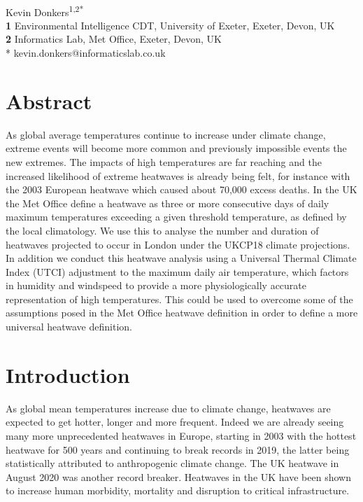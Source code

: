 \documentclass[10pt,letterpaper]{article}
\begin{document}
\vspace*{0.2in}

\begin{flushleft}
{\Large
\textbf{}}
\newline
\\
Kevin Donkers\textsuperscript{1,2*}
\\
\bigskip
\textbf{1} Environmental Intelligence CDT, University of Exeter, Exeter, Devon, UK
\\
\textbf{2} Informatics Lab, Met Office, Exeter, Devon, UK
\\
\bigskip
* kevin.donkers@informaticslab.co.uk
\end{flushleft}


\section*{Abstract}

As global average temperatures continue to increase under climate change, extreme events will become more common and previously impossible events the new extremes. The impacts of high temperatures are far reaching and the increased likelihood of extreme heatwaves is already being felt, for instance with the 2003 European heatwave which caused about 70,000 excess deaths\cite{Vautard2020}. In the UK the Met Office define a heatwave as three or more consecutive days of daily maximum temperatures exceeding a given threshold temperature, as defined by the local climatology.\cite{McCarthy2019} We use this to analyse the number and duration of heatwaves projected to occur in London under the UKCP18 climate projections. In addition we conduct this heatwave analysis using a Universal Thermal Climate Index (UTCI) adjustment to the maximum daily air temperature, which factors in humidity and windspeed to provide a more physiologically accurate representation of high temperatures. This could be used to overcome some of the assumptions posed in the Met Office heatwave definition in order to define a more universal heatwave definition.

\section*{Introduction}

As global mean temperatures increase due to climate change, heatwaves are expected to get hotter, longer and more frequent. 
Indeed we are already seeing many more unprecedented heatwaves in Europe, starting in 2003 with the hottest heatwave for 500 years\cite{Stott2004} and continuing to break records in 2019, the latter being statistically attributed to anthropogenic climate change.\cite{Vautard2020} 
The UK heatwave in August 2020 was another record breaker.\cite{Askew2020}
Heatwaves in the UK have been shown to increase human morbidity\cite{Smith2016}, mortality\cite{Johnson2004} and disruption to critical infrastructure.\cite{Dawson2016}
\end{document}
